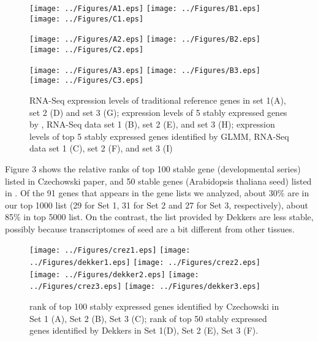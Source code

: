 \documentclass[11pt, a4paper]{article}
\begin{document}
\begin{landscape}
 \begin{figure}[H]
\begin{center}
\texttt{[image: ../Figures/A1.eps]}
\texttt{[image: ../Figures/B1.eps]}
\texttt{[image: ../Figures/C1.eps]}

\texttt{[image: ../Figures/A2.eps]}
\texttt{[image: ../Figures/B2.eps]}
\texttt{[image: ../Figures/C2.eps]}

\texttt{[image: ../Figures/A3.eps]}
\texttt{[image: ../Figures/B3.eps]}
\texttt{[image: ../Figures/C3.eps]}
\caption{{\small{\label{fig:scaled_diss} RNA-Seq expression levels of traditional reference genes in set 1(A), set 2 (D) and set 3 (G)}; expression levels of 5 stably expressed genes by \cite{czechowski2005genome}, RNA-Seq data set 1 (B), set 2 (E), and set 3 (H); expression levels of top 5 stably expressed genes identified by GLMM, RNA-Seq data set 1 (C), set 2 (F), and set 3 (I) }}
\end{center}
\end{figure} 
\end{landscape}
Figure 3 shows the relative ranks of top 100 stable gene (developmental series) listed in Czechowski paper, and 50 stable genes (Arabidopsis thaliana seed) listed in \cite{dekkers2012identification}. Of the 91 genes that appears in the gene lists we analyzed, about 30\% are in our top 1000 list (29 for Set 1, 31 for Set 2 and 27 for Set 3, respectively), about 85\% in top 5000 list. On the contrast, the list provided by Dekkers are less stable, possibly because transcriptomes of seed are a bit different from other tissues.

 \begin{figure}[h!]
\begin{center}
\texttt{[image: ../Figures/crez1.eps]}
\texttt{[image: ../Figures/dekker1.eps]}
\texttt{[image: ../Figures/crez2.eps]}
\texttt{[image: ../Figures/dekker2.eps]}
\texttt{[image: ../Figures/crez3.eps]}
\texttt{[image: ../Figures/dekker3.eps]}
\caption{\label{fig:scaled_diss} rank of top 100 stably expressed genes identified by Czechowski in Set 1 (A), Set 2 (B), Set 3 (C); rank of top 50 stably expressed genes identified by Dekkers in Set 1(D), Set 2 (E), Set 3 (F).  }
\end{center}
\end{figure}
\end{document}
